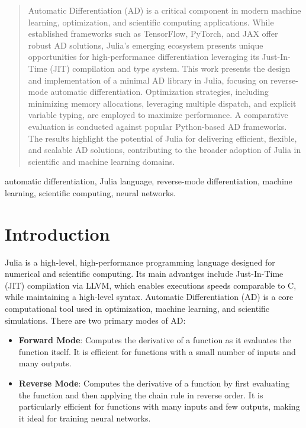 \documentclass[conference]{IEEEtran}
\begin{document}
\begin{abstract}
Automatic Differentiation (AD) is a critical component in modern machine learning, 
optimization, and scientific computing applications. 
While established frameworks such as TensorFlow, PyTorch, 
and JAX offer robust AD solutions, Julia's emerging ecosystem presents unique opportunities 
for high-performance differentiation leveraging its Just-In-Time (JIT) compilation and 
type system. This work presents the design and implementation of a minimal AD library 
in Julia, focusing on reverse-mode automatic differentiation. 
Optimization strategies, including minimizing memory allocations, 
leveraging multiple dispatch, and explicit variable typing, are employed to 
maximize performance. A comparative evaluation is conducted against popular 
Python-based AD frameworks. The results highlight the potential of Julia for 
delivering efficient, flexible, and scalable AD solutions, contributing to the 
broader adoption of Julia in scientific and machine learning domains.
\end{abstract}

\begin{IEEEkeywords}
automatic differentiation, Julia language, reverse-mode differentiation, machine learning, 
scientific computing, neural networks.
\end{IEEEkeywords}

\section{Introduction}
Julia is a high-level, high-performance programming language designed for numerical 
and scientific computing. Its main advantges include Just-In-Time (JIT) compilation via LLVM, 
which enables executions speeds comparable to C, while maintaining a high-level syntax. 
Automatic Differentiation (AD) is a core computational tool used in optimization, 
machine learning, and scientific simulations. There are two primary modes of AD:

\begin{itemize}
    \item \textbf{Forward Mode}: Computes the derivative of a function as it evaluates the function itself. 
    It is efficient for functions with a small number of inputs and many outputs.
    \item \textbf{Reverse Mode}: Computes the derivative of a function by first evaluating the function and then 
    applying the chain rule in reverse order. It is particularly efficient for functions with many inputs and few outputs, 
    making it ideal for training neural networks.
\end{itemize}
\end{document}
